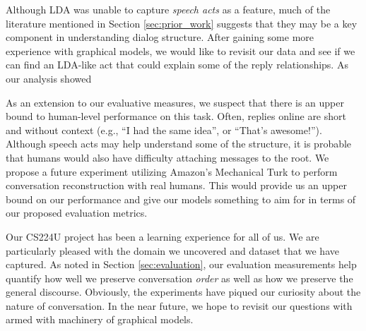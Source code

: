 \documentclass{article}
\begin{document}
Although LDA was unable to capture \textit{speech acts} as a feature, much of
the literature mentioned in Section \ref{sec:prior_work} suggests that they may
be a key component in understanding dialog structure. After gaining some more
experience with graphical models, we would like to revisit our
data and see if we can find an LDA-like act that could explain some of the reply
relationships. As our analysis showed

As an extension to our evaluative measures, we suspect that there is an upper
bound to human-level performance on this task. Often, replies online are short
and without context (e.g., ``I had the same idea'', or ``That's awesome!'').
Although speech acts may help understand some of the structure, it is probable
that humans would also have difficulty attaching messages to the root. We
propose a future experiment utilizing Amazon's Mechanical Turk to perform
conversation reconstruction with real humans. This would provide us an upper
bound on our performance and give our models something to aim for in terms of
our proposed evaluation metrics.

Our CS224U project has been a learning experience for all of us. We are
particularly pleased with the domain we uncovered and dataset that we have
captured. As noted in Section \ref{sec:evaluation}, our evaluation measurements
help quantify how well we preserve conversation \textit{order} as well as how we
preserve the general discourse. Obviously, the experiments have piqued our curiosity 
about the nature of conversation. In the near future, we hope to revisit our 
questions with armed with machinery of graphical models.

{} 

\end{document}

